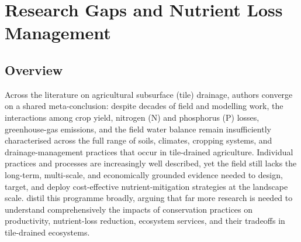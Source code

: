 \documentclass[11pt]{article}
\begin{document}
\section*{Research Gaps and Nutrient Loss Management}

\subsection{Overview}

Across the literature on agricultural subsurface (tile) drainage, authors converge on a shared meta-conclusion: despite decades of field and modelling work, the interactions among crop yield, nitrogen (N) and phosphorus (P) losses, greenhouse-gas emissions, and the field water balance remain insufficiently characterised across the full range of soils, climates, cropping systems, and drainage-management practices that occur in tile-drained agriculture. Individual practices and processes are increasingly well described, yet the field still lacks the long-term, multi-scale, and economically grounded evidence needed to design, target, and deploy cost-effective nutrient-mitigation strategies at the landscape scale. \textcite{Ma2025} distil this programme broadly, arguing that far more research is needed to understand comprehensively the impacts of conservation practices on productivity, nutrient-loss reduction, ecosystem services, and their tradeoffs in tile-drained ecosystems.
\end{document}
